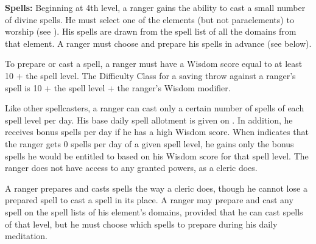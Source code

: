 


\textbf{Spells:} Beginning at 4th level, a ranger gains the ability to cast a small number of divine spells. He must select one of the elements (but not paraelements) to worship (see ). His spells are drawn from the spell list of all the domains from that element. A ranger must choose and prepare his spells in advance (see below).

To prepare or cast a spell, a ranger must have a Wisdom score equal to at least 10 + the spell level. The Difficulty Class for a saving throw against a ranger's spell is 10 + the spell level + the ranger's Wisdom modifier.

Like other spellcasters, a ranger can cast only a certain number of spells of each spell level per day. His base daily spell allotment is given on . In addition, he receives bonus spells per day if he has a high Wisdom score. When  indicates that the ranger gets 0 spells per day of a given spell level, he gains only the bonus spells he would be entitled to based on his Wisdom score for that spell level. The ranger does not have access to any granted powers, as a cleric does.

A ranger prepares and casts spells the way a cleric does, though he cannot lose a prepared spell to cast a  spell in its place. A ranger may prepare and cast any spell on the spell lists of his element's domains, provided that he can cast spells of that level, but he must choose which spells to prepare during his daily meditation.

